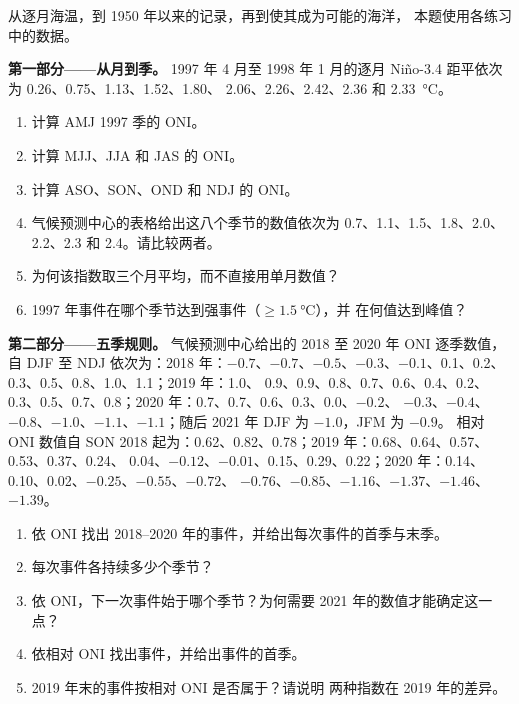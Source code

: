 \begin{problem}\label{pb:b2:climate-variability:1}
从逐月海温，到 1950 年以来的记录，再到使其成为可能的海洋，
本题使用各练习中的数据。

\medskip\noindent\textbf{第一部分——从月到季。}
1997 年 4 月至 1998 年 1 月的逐月 Niño-3.4 距平依次为 0.26、0.75、1.13、1.52、1.80、
2.06、2.26、2.42、2.36 和 \qty{2.33}{\celsius}。
\begin{enumerate}
  \item 计算 AMJ 1997 季的 ONI。
  \item 计算 MJJ、JJA 和 JAS 的 ONI。
  \item 计算 ASO、SON、OND 和 NDJ 的 ONI。
  \item 气候预测中心的表格给出这八个季节的数值依次为 0.7、1.1、1.5、1.8、2.0、2.2、2.3 和
        2.4。请比较两者。
  \item 为何该指数取三个月平均，而不直接用单月数值？
  \item 1997 年事件在哪个季节达到强事件（$\geq \qty{1.5}{\celsius}$），并
        在何值达到峰值？
\end{enumerate}

\medskip\noindent\textbf{第二部分——五季规则。}
气候预测中心给出的 2018 至 2020 年 ONI 逐季数值，自 DJF 至
NDJ 依次为：2018 年：$-0.7$、$-0.7$、$-0.5$、$-0.3$、$-0.1$、0.1、0.2、0.3、0.5、0.8、1.0、1.1；2019 年：1.0、
0.9、0.9、0.8、0.7、0.6、0.4、0.2、0.3、0.5、0.7、0.8；2020 年：0.7、0.7、0.6、0.3、0.0、$-0.2$、
$-0.3$、$-0.4$、$-0.8$、$-1.0$、$-1.1$、$-1.1$；随后 2021 年 DJF 为 $-1.0$，JFM 为 $-0.9$。
相对 ONI 数值自 SON 2018 起为：0.62、0.82、0.78；2019 年：0.68、0.64、0.57、0.53、0.37、0.24、
0.04、$-0.12$、$-0.01$、0.15、0.29、0.22；2020 年：0.14、0.10、0.02、$-0.25$、$-0.55$、$-0.72$、
$-0.76$、$-0.85$、$-1.16$、$-1.37$、$-1.46$、$-1.39$。
\begin{enumerate}[resume]
  \item 依 ONI 找出 2018--2020 年的事件，并给出每次事件的首季与末季。
  \item 每次事件各持续多少个季节？
  \item 依 ONI，下一次事件始于哪个季节？为何需要
        2021 年的数值才能确定这一点？
  \item 依相对 ONI 找出事件，并给出事件的首季。
  \item 2019 年末的事件按相对 ONI 是否属于？请说明
        两种指数在 2019 年的差异。
\end{enumerate}


\end{problem}

